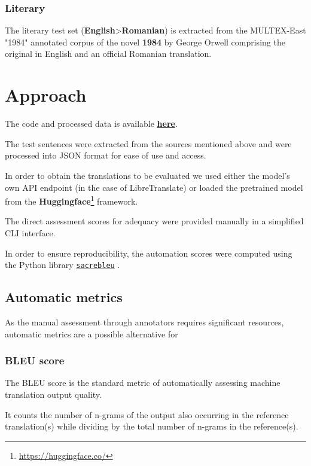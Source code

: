 \documentclass[11pt]{article}
\begin{document}
\subsubsection{Literary}

The literary test set (\textbf{English}>\textbf{Romanian}) is extracted
from the MULTEX-East "1984" \citep{11356/1043} annotated corpus
of the novel \textbf{1984} by George Orwell
comprising the original in English
and an official Romanian translation.

\section{Approach}
\label{section:approach}

The code and processed data is available \textbf{\href{https://github.com/mihnea-mihai/mt-eval}{here}}.

The test sentences were extracted from the sources mentioned above
and were processed into JSON format for ease of use and access.

In order to obtain the translations to be evaluated we used either
the model's own API endpoint (in the case of LibreTranslate)
or loaded the pretrained model from the
\textbf{Huggingface}\footnote{\url{https://huggingface.co/}} framework.

The direct assessment scores for adequacy were provided manually
in a simplified CLI interface.

In order to ensure reproducibility, the automation scores were computed
using the Python library \texttt{\href{https://github.com/mjpost/sacrebleu}{sacrebleu}}
\citep{post-2018-call}.

\subsection{Automatic metrics}

As the manual assessment through annotators requires significant resources,
automatic metrics are a possible alternative for 

\subsubsection{BLEU score}

The BLEU score \citep{papineni-etal-2002-bleu}
is the standard metric of automatically assessing machine
translation output quality.

It counts the number of n-grams of the output also occurring in the reference translation(s)
while dividing by the total number of n-grams in the reference(s).
\end{document}
